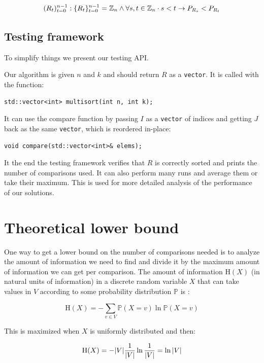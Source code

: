\documentclass{article}
\DeclarePairedDelimiter{\set}{\{}{\}}
\DeclarePairedDelimiter{\abs}{\lvert}{\rvert}
\begin{document}
$$ (R_t)_{t=0}^{n - 1}  : \set{R_t}_{t=0}^{n - 1} = \mathbb{Z}_n \land \forall s,t \in \mathbb{Z}_n \cdot s < t \rightarrow P_{R_s} < P_{R_t} $$

\subsection{Testing framework}

To simplify things we present our testing API.

Our algorithm is given $ n $ and $ k $ and should return $ R $ as a \verb|vector|. It is called with the function:

\begin{lstlisting}
std::vector<int> multisort(int n, int k);
\end{lstlisting}

It can use the compare function by passing $ I $ as a \verb|vector| of indices and getting $ J $ back as the same \verb|vector|, which is reordered in-place:

\begin{lstlisting}
void compare(std::vector<int>& elems);
\end{lstlisting}

It the end the testing framework verifies that $ R $ is correctly sorted and prints the number of comparisons used. It can also perform many runs and average them or take their maximum. This is used for more detailed analysis of the performance of our solutions.

\section{Theoretical lower bound}

One way to get a lower bound on the number of comparisons needed is to analyze the amount of information we need to find and divide it by the maximum amount of information we can get per comparison. The amount of information $ \mathrm{H}(X) $ (in natural units of information) in a discrete random variable $ X $ that can take values in $ V $ according to some probability distribution $ \mathbb{P} $ is \cite{informationtheory}:

$$ \mathrm{H}(X) = - \sum_{v \in V} \mathbb{P}(X = v) \ln{\mathbb{P}(X = v)} $$

This is maximized when $ X $ is uniformly distributed \cite{informationtheory} and then:

$$ \mathrm{H}(X) = - \abs{V} \frac{1}{\abs{V}} \ln{\frac{1}{\abs{V}}} = \ln{\abs{V}} $$
\end{document}
